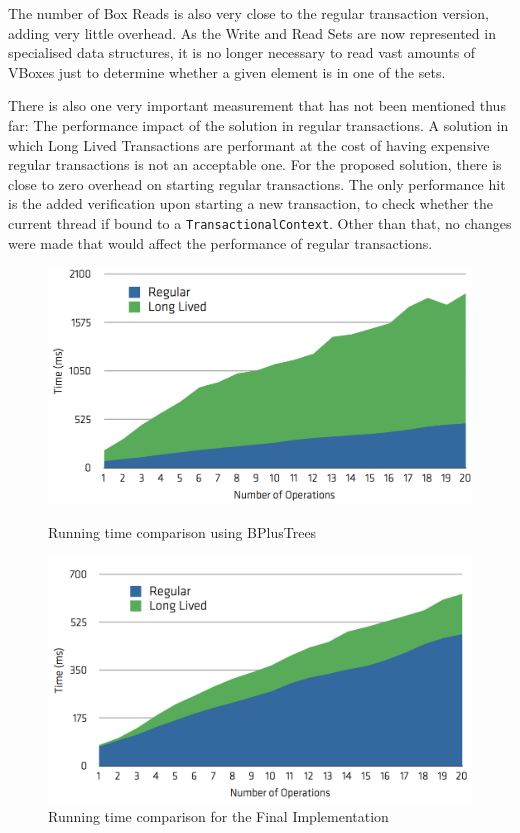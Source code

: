 \documentclass{llncs}
\begin{document}
The number of Box Reads is also very close to the regular transaction
version, adding very little overhead. As the Write and Read Sets are
now represented in specialised data structures, it is no longer
necessary to read vast amounts of VBoxes just to determine whether a
given element is in one of the sets. 

There is also one very important measurement that has not been
mentioned thus far: The performance impact of the solution in regular
transactions. A solution in which Long Lived Transactions are
performant at the cost of having expensive regular transactions is not
an acceptable one. For the proposed solution, there is close to zero
overhead on starting regular transactions. The only performance hit is
the added verification upon starting a new transaction, to check
whether the current thread if bound to a
\texttt{TransactionalContext}. Other than that, no changes were made
that would affect the performance of regular transactions.

\begin{figure}
\centering
\begin{minipage}{.5\textwidth}
  \centering
  \includegraphics[width=0.9\linewidth]{comparison-bplus}
  \caption{Running time comparison using BPlusTrees}
  \label{fig:comparisonBPlus}
\end{minipage}%
\begin{minipage}{.5\textwidth}
  \centering
  \includegraphics[width=0.9\linewidth]{comparison-final}
  \caption{Running time comparison for the Final Implementation}
  \label{fig:comparisonFinal}
\end{minipage}
\end{figure}
\end{document}
